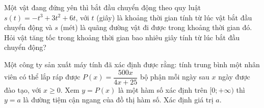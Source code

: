 \begin{ex}%
	Một vật đang đứng yên thì bắt đầu chuyển động theo quy luật $s(t)=-t^3+3t^2+6t$, với $t$ (giây) là khoảng thời gian tính từ lúc vật bắt đầu chuyển động và $s$ (mét) là quãng đường vật đi được trong khoảng thời gian đó. Hỏi vật tăng tốc trong khoảng thời gian bao nhiêu giây tính từ lúc bắt đầu chuyển động?
\end{ex}

\begin{ex}%
	Một công ty sản xuất máy tính đã xác định được rằng: tính trung bình một nhân viên có thể lắp ráp được $P(x)=\dfrac{500x}{4x+25}$ bộ phận mỗi ngày sau $x$ ngày được đào tạo, với $x \geq 0$. Xem $y=P(x)$ là một hàm số xác định trên $[0;+\infty)$ thì $y=a$ là đường tiệm cận ngang của đồ thị hàm số. Xác định giá trị $a$.
\end{ex}

